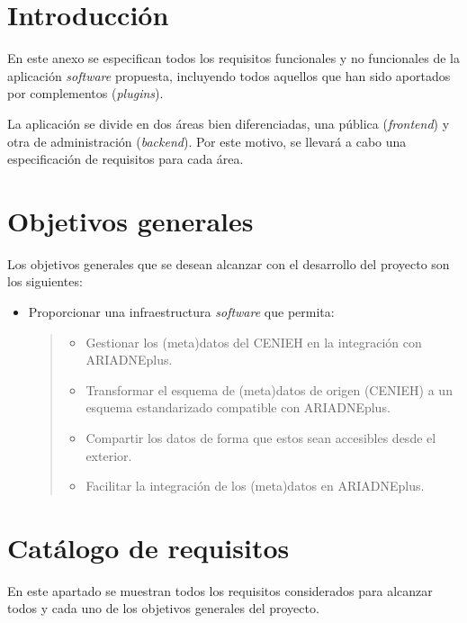 
\section{Introducción}

En este anexo se especifican todos los requisitos funcionales y no
funcionales de la aplicación \emph{software} propuesta, incluyendo todos
aquellos que han sido aportados por complementos (\emph{plugins}).

La aplicación se divide en dos áreas bien diferenciadas, una pública
(\emph{frontend}) y otra de administración (\emph{backend}). Por este
motivo, se llevará a cabo una especificación de requisitos para cada
área.

\section{Objetivos generales}

Los objetivos generales que se desean alcanzar con el desarrollo del
proyecto son los siguientes:

\begin{itemize}
\item
  Proporcionar una infraestructura \emph{software} que permita:

  \begin{quote}
  \begin{itemize}
  \tightlist
  \item
    Gestionar los (meta)datos del CENIEH en la integración con
    ARIADNEplus.
  \item
    Transformar el esquema de (meta)datos de origen (CENIEH) a un
    esquema estandarizado compatible con ARIADNEplus.
  \item
    Compartir los datos de forma que estos sean accesibles desde el
    exterior.
  \item
    Facilitar la integración de los (meta)datos en ARIADNEplus.
  \end{itemize}
  \end{quote}
\end{itemize}

\section{Catálogo de requisitos}

En este apartado se muestran todos los requisitos considerados para
alcanzar todos y cada uno de los objetivos generales del proyecto.

